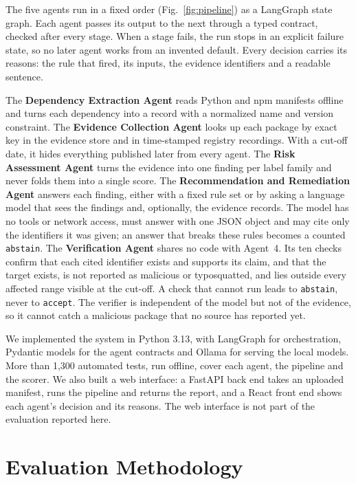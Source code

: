 \documentclass[conference]{IEEEtran}
\begin{document}
The five agents run in a fixed order (Fig.~\ref{fig:pipeline}) as a LangGraph state graph. Each agent passes its
output to the next through a typed contract, checked after every stage. When a stage fails, the run stops in an
explicit failure state, so no later agent works from an invented default. Every decision carries its reasons:
the rule that fired, its inputs, the evidence identifiers and a readable sentence.

The \textbf{Dependency Extraction Agent} reads Python and npm manifests offline and turns each dependency into a
record with a normalized name and version constraint. The \textbf{Evidence Collection Agent} looks up each package by
exact key in the evidence store and in time-stamped registry recordings. With a cut-off date, it hides everything
published later from every agent. The \textbf{Risk Assessment Agent} turns the evidence into one finding per label
family and never folds them into a single score. The \textbf{Recommendation and Remediation Agent} answers each
finding, either with a fixed rule set or by asking a language model that sees the findings and, optionally, the
evidence records. The model has no tools or network access, must answer with one JSON object and may cite only the
identifiers it was given; an answer that breaks these rules becomes a counted \texttt{abstain}. The
\textbf{Verification Agent} shares no code with Agent~4. Its ten checks confirm that each
cited identifier exists and supports its claim, and that the target exists, is not reported as malicious or
typosquatted, and lies outside every affected range visible at the cut-off. A check that cannot run leads to
\texttt{abstain}, never to \texttt{accept}. The verifier is independent of the model but not of the evidence, so it
cannot catch a malicious package that no source has reported yet.

We implemented the system in Python 3.13, with LangGraph for orchestration, Pydantic models for the agent contracts
and Ollama for serving the local models. More than 1,300 automated tests, run offline, cover each agent, the
pipeline and the scorer. We also built a web interface: a FastAPI back end takes an uploaded manifest, runs the
pipeline and returns the report, and a React front end shows each agent's decision and its reasons. The web
interface is not part of the evaluation reported here.

\section{Evaluation Methodology}
\label{sec:method}
\end{document}
